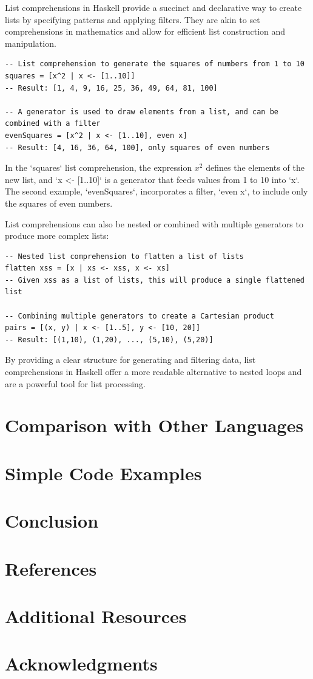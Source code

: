 \documentclass[a4paper, 10pt]{article}
\begin{document}
            List comprehensions in Haskell provide a succinct and declarative way to create lists by specifying patterns and applying filters. They are akin to set comprehensions in mathematics and allow for efficient list construction and manipulation.

            \lstset{language=Haskell}
            \begin{lstlisting}
-- List comprehension to generate the squares of numbers from 1 to 10
squares = [x^2 | x <- [1..10]]
-- Result: [1, 4, 9, 16, 25, 36, 49, 64, 81, 100]

-- A generator is used to draw elements from a list, and can be combined with a filter
evenSquares = [x^2 | x <- [1..10], even x]
-- Result: [4, 16, 36, 64, 100], only squares of even numbers
            \end{lstlisting}

            In the `squares` list comprehension, the expression $x^2$ defines the elements of the new list, and `x <- [1..10]` is a generator that feeds values from 1 to 10 into `x`. The second example, `evenSquares`, incorporates a filter, `even x`, to include only the squares of even numbers.

            List comprehensions can also be nested or combined with multiple generators to produce more complex lists:

            \begin{lstlisting}
-- Nested list comprehension to flatten a list of lists
flatten xss = [x | xs <- xss, x <- xs]
-- Given xss as a list of lists, this will produce a single flattened list

-- Combining multiple generators to create a Cartesian product
pairs = [(x, y) | x <- [1..5], y <- [10, 20]]
-- Result: [(1,10), (1,20), ..., (5,10), (5,20)]
            \end{lstlisting}

            By providing a clear structure for generating and filtering data, list comprehensions in Haskell offer a more readable alternative to nested loops and are a powerful tool for list processing.
	\section{Comparison with Other Languages}
	\section{Simple Code Examples}
	\section{Conclusion}
	\section{References}
	\section{Additional Resources}
	\section{Acknowledgments}
\end{document}
